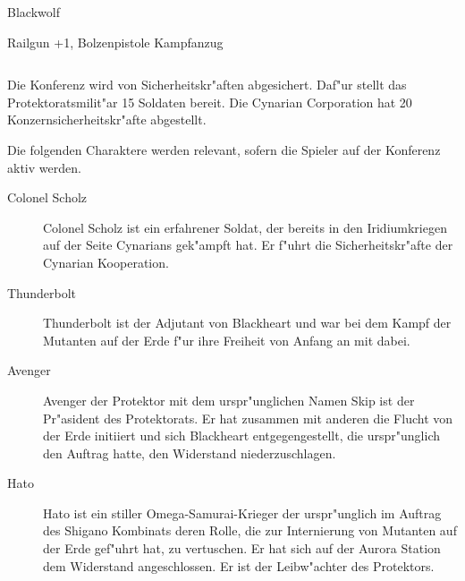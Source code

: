 \begin{column}[l]{0.45}
    \begin{nscsheet}[h]{Blackwolf}
        \nscstats[ATT=2,AGG=3,CON=2]
        \nscruler
        \begin{nscinventory}
            \nscitem[Waffen] Railgun +1, Bolzenpistole
            \nscitem[R"ustung] Kampfanzug
        \end{nscinventory}
    \end{nscsheet}    
\end{column}
\begin{column}[r]{0.45}

\end{column}


Die Konferenz wird von Sicherheitskr"aften abgesichert. Daf"ur stellt das Protektoratsmilit"ar 15 Soldaten bereit. Die 
Cynarian Corporation hat 20 Konzernsicherheitskr"afte abgestellt.

Die folgenden Charaktere werden relevant, sofern die Spieler auf der Konferenz aktiv werden.

\begin{description}
    \item[Colonel Scholz] Colonel Scholz ist ein erfahrener Soldat, der bereits in den Iridiumkriegen auf der Seite Cynarians gek"ampft hat. 
        Er f"uhrt die Sicherheitskr"afte der Cynarian Kooperation.
    \item[Thunderbolt] Thunderbolt ist der Adjutant von Blackheart und war bei dem Kampf der Mutanten auf der Erde f"ur ihre Freiheit von 
        Anfang an mit dabei.
    \item[Avenger] Avenger der Protektor mit dem urspr"unglichen Namen Skip ist der Pr"asident des Protektorats. Er hat zusammen mit anderen 
        die Flucht von der Erde initiiert und sich Blackheart entgegengestellt, die urspr"unglich den Auftrag hatte, den Widerstand niederzuschlagen.
    \item[Hato] Hato ist ein stiller Omega-Samurai-Krieger der urspr"unglich im Auftrag des Shigano Kombinats deren Rolle, die zur 
        Internierung von Mutanten auf der Erde gef"uhrt hat, zu vertuschen. Er hat sich auf der Aurora Station dem Widerstand angeschlossen. Er ist der Leibw"achter des Protektors.
\end{description}
\vfill\pagebreak

